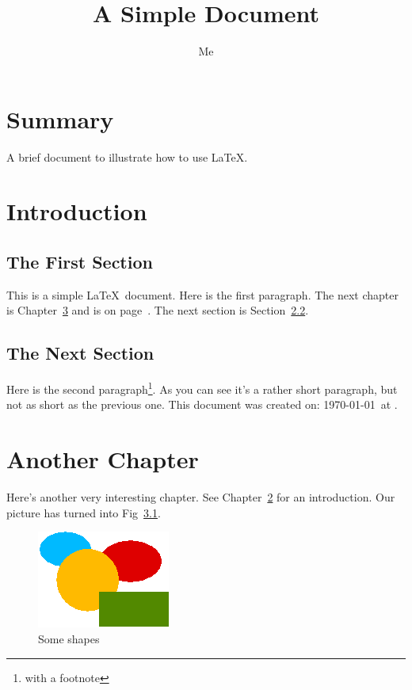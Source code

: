 \documentclass[12pt,captions=tableabove]{scrbook}
\renewcommand*{\figurename}{Fig}
\begin{document}
\title{A Simple Document}
\author{Me}

\maketitle

\frontmatter
\tableofcontents
\listoffigures
\listoftables

\chapter{Summary}
A brief document to
illustrate how to use \LaTeX.

\mainmatter
\chapter{Introduction}
\label{ch:intro}

\section{The First Section}

This is a simple \LaTeX\ document.
Here is the first paragraph.
The next chapter is Chapter~\ref{ch:another}
and is on page~\pageref{ch:another}.
The next section is Section~\ref{sec:next}.

\section{The Next Section}
\label{sec:next}

Here is the second paragraph\footnote{with a footnote}. 
As you can see it's a rather short paragraph, but not 
as short as the previous one. This document was 
created on: \today\ at \currenttime.

\chapter{Another Chapter}
\label{ch:another}

Here's another very interesting chapter.
See Chapter~\ref{ch:intro} for an 
introduction. Our picture has turned
into \figurename~\ref{fig:shapes}.

\begin{figure}[hbtp]
\centering
 \includegraphics{shapes}
\caption{Some shapes}
\label{fig:shapes}
\end{figure}
\end{document}
